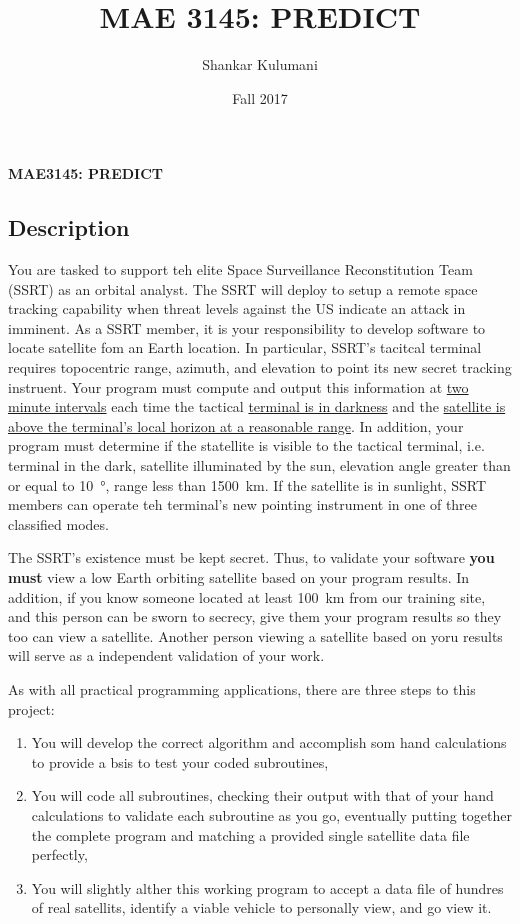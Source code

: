 \documentclass[11pt, reqno]{article}    %
\title{MAE 3145: PREDICT}
\author{Shankar Kulumani}
\date{Fall 2017}                          %
\begin{document}
\begin{center}
{\Large \textbf{MAE3145: PREDICT}}
\end{center}
\subsection*{Description}
You are tasked to support teh elite Space Surveillance Reconstitution Team (SSRT) as an orbital analyst.
The SSRT will deploy to setup a remote space tracking capability when threat levels against the US indicate an attack in imminent.
As a SSRT member, it is your responsibility to develop software to locate satellite fom an Earth location.
In particular, SSRT's tacitcal terminal requires topocentric range, azimuth, and elevation to point its new secret tracking instruent.
Your program must compute and output this information at \underline{two minute intervals} each time the tactical \underline{terminal is in darkness} and the \underline{satellite is above the terminal's local horizon at a reasonable range}.
In addition, your program must determine if the statellite is visible to the tactical terminal, i.e. terminal in the dark, satellite illuminated by the sun, elevation angle greater than or equal to \SI{10}{\degree}, range less than \SI{1500}{\kilo\meter}.
If the satellite is in sunlight, SSRT members can operate teh terminal's new pointing instrument in one of three classified modes.

The SSRT's existence must be kept secret.
Thus, to validate your software \textbf{you must} view a low Earth orbiting satellite based on your program results.
In addition, if you know someone located at least \SI{100}{\kilo\meter} from our training site, and this person can be sworn to secrecy, give them your program results so they too can view a satellite.
Another person viewing a satellite based on yoru results will serve as a independent validation of your work.

As with all practical programming applications, there are three steps to this project:
\begin{enumerate}
    \item You will develop the correct algorithm and accomplish som hand calculations to provide a bsis to test your coded subroutines,
    \item You will code all subroutines, checking their output with that of your hand calculations to validate each subroutine as you go, eventually putting together the complete program and matching a provided single satellite data file perfectly,
    \item You will slightly alther this working program to accept a data file of hundres of real satellits, identify a viable vehicle to personally view, and go view it.
\end{enumerate}
\end{document}
